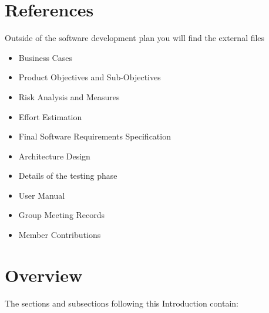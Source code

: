 \section{References}

Outside of the software development plan you will find the external files

\begin{itemize}
	\item Business Cases
	\item Product Objectives and Sub-Objectives
	\item Risk Analysis and Measures
	\item Effort Estimation
	\item Final Software Requirements Specification
	\item Architecture Design
	\item Details of the testing phase
	\item User Manual
	\item Group Meeting Records
	\item Member Contributions 
\end{itemize}


\section{Overview}

The sections and subsections following this Introduction contain:


